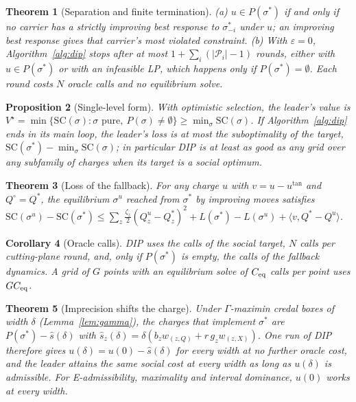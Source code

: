 \documentclass[preprint,12pt]{elsarticle}
\newtheorem{theorem}{Theorem}
\newtheorem{proposition}[theorem]{Proposition}
\newtheorem{corollary}[theorem]{Corollary}
\theoremstyle{definition}
\theoremstyle{remark}
\newcommand{\ip}[2]{\langle #1,#2\rangle}
\begin{document}
\begin{theorem}[Separation and finite termination]\label{thm:cut}
(a) $u\in P(\sigma^*)$ if and only if no carrier has a strictly improving best response to $\sigma^*_{-i}$ under $u$; an improving best response gives that carrier's most violated constraint. (b) With $\varepsilon=0$, Algorithm~\ref{alg:dip} stops after at most $1+\sum_i(|\mathcal P_i|-1)$ rounds, either with $u\in P(\sigma^*)$ or with an infeasible LP, which happens only if $P(\sigma^*)=\emptyset$. Each round costs $N$ oracle calls and no equilibrium solve.
\end{theorem}

\begin{proposition}[Single-level form]\label{prop:opt}
With optimistic selection, the leader's value is $V^\star=\min\{\mathrm{SC}(\sigma):\sigma\text{ pure},\ P(\sigma)\ne\emptyset\}\ge\min_\sigma\mathrm{SC}(\sigma)$. If Algorithm~\ref{alg:dip} ends in its main loop, the leader's loss is at most the suboptimality of the target, $\mathrm{SC}(\sigma^*)-\min_\sigma\mathrm{SC}(\sigma)$; in particular DIP is at least as good as any grid over any subfamily of charges when its target is a social optimum.
\end{proposition}

\begin{theorem}[Loss of the fallback]\label{thm:fallback}
For any charge $u$ with $v=u-u^{\tan}$ and $Q^\circ=Q^*$, the equilibrium $\sigma^u$ reached from $\sigma^*$ by improving moves satisfies $\mathrm{SC}(\sigma^u)-\mathrm{SC}(\sigma^*)\le\sum_z\tfrac{\zeta_z}{2}(Q^u_z-Q^*_z)^2+L(\sigma^*)-L(\sigma^u)+\ip{v}{Q^*-Q^u}$.
\end{theorem}

\begin{corollary}[Oracle calls]\label{cor:calls}
DIP uses the calls of the social target, $N$ calls per cutting-plane round, and, only if $P(\sigma^*)$ is empty, the calls of the fallback dynamics. A grid of $G$ points with an equilibrium solve of $C_{\rm eq}$ calls per point uses $GC_{\rm eq}$.
\end{corollary}

\begin{theorem}[Imprecision shifts the charge]\label{thm:credal}
Under $\Gamma$-maximin credal boxes of width $\delta$ (Lemma~\ref{lem:gamma}), the charges that implement $\sigma^*$ are $P(\sigma^*)-\hat s(\delta)$ with $\hat s_z(\delta)=\delta(b_zw_{(z,Q)}+r\,g_zw_{(z,X)})$. One run of DIP therefore gives $u(\delta)=u(0)-\hat s(\delta)$ for every width at no further oracle cost, and the leader attains the same social cost at every width as long as $u(\delta)$ is admissible. For E-admissibility, maximality and interval dominance, $u(0)$ works at every width.
\end{theorem}
\end{document}
